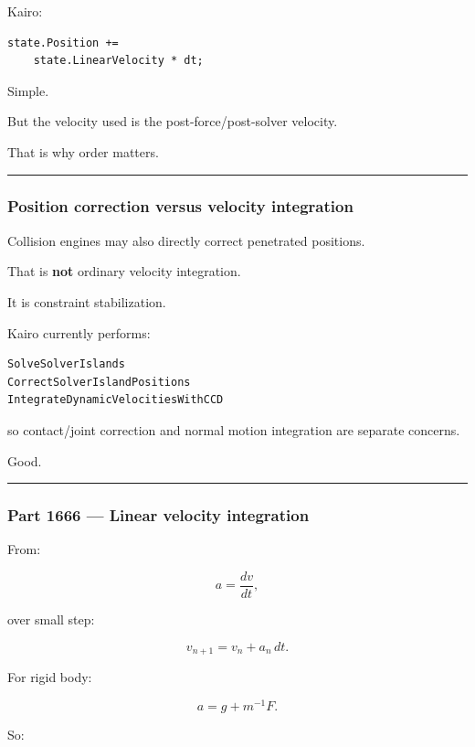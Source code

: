 Kairo:

\begin{verbatim}
state.Position +=
    state.LinearVelocity * dt;
\end{verbatim}

Simple.

But the velocity used is the post-force/post-solver velocity.

That is why order matters.

\begin{center}\rule{0.5\linewidth}{0.5pt}\end{center}

\subsubsection{Position correction versus velocity integration}\label{position-correction-versus-velocity-integration}

Collision engines may also directly correct penetrated positions.

That is \textbf{not} ordinary velocity integration.

It is constraint stabilization.

Kairo currently performs:

\begin{verbatim}
SolveSolverIslands
CorrectSolverIslandPositions
IntegrateDynamicVelocitiesWithCCD
\end{verbatim}

so contact/joint correction and normal motion integration are separate concerns.

Good.

\begin{center}\rule{0.5\linewidth}{0.5pt}\end{center}

\subsubsection{Part 1666 --- Linear velocity integration}\label{part-1666-linear-velocity-integration}

From:

\[
a=\frac{dv}{dt},
\]

over small step:

\[
\boxed{
v_{n+1}
=
v_n+a_n\,dt.
}
\]

For rigid body:

\[
a
=
g
+
m^{-1}F.
\]

So:

